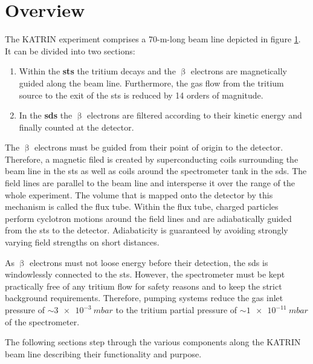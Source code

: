 \section{Overview}
\label{sec:katrinExpSetupOverview}
\begin{figure}[t]
	\label{fig:katrinExpSetupBeamline}
\end{figure}
The KATRIN experiment comprises a 70-m-long beam line depicted in figure \ref{fig:katrinExpSetupBeamline}. It can be divided into two sections: 
\begin{enumerate}
	\item Within the \textbf{\gls{sts}} the tritium decays and the $\upbeta$ electrons are magnetically guided along the beam line. Furthermore, the gas flow from the tritium source to the exit of the \gls{sts} is reduced by 14 orders of magnitude.
	\item In the \textbf{\gls{sds}} the $\upbeta$ electrons are filtered according to their kinetic energy and finally counted at the detector.
\end{enumerate}
The $\upbeta$ electrons must be guided from their point of origin to the detector. Therefore, a magnetic filed is created by superconducting coils surrounding the beam line in the \gls{sts} as well as coils around the spectrometer tank in the \gls{sds}. The field lines are parallel to the beam line and intersperse it over the range of the whole experiment. The volume that is mapped onto the detector by this mechanism is called the flux tube. Within the flux tube, charged particles perform cyclotron motions around the field lines and are adiabatically guided from the \gls{sts} to the detector. Adiabaticity is guaranteed by avoiding strongly varying field strengths on short distances. 

As $\upbeta$ electrons must not loose energy before their detection, the \gls{sds} is windowlessly connected to the \gls{sts}. However, the spectrometer must be kept practically free of any tritium flow for safety reasons and to keep the strict background requirements. Therefore, pumping systems reduce the gas inlet pressure of $\sim\SI{3e-3}{mbar}$ to the tritium partial pressure of $\sim\SI{1e-11}{mbar}$ of the spectrometer.

The following sections step through the various components along the KATRIN beam line describing their functionality and purpose.
